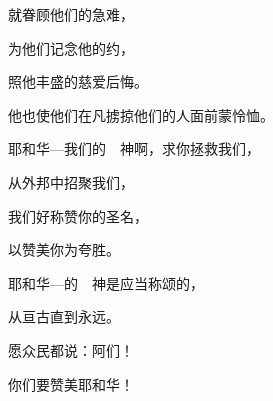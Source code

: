 {\par }{\Q 就眷顾他们的急难，
\par }{\Q {}为他们记念他的约，
\par }{\Q 照他丰盛的慈爱后悔。
\par }{\Q {}他也使他们在凡掳掠他们的人面前蒙怜恤。
\par }{\BB \par }{\Q {}耶和华—我们的　神啊，求你拯救我们，
\par }{\Q 从外邦中招聚我们，
\par }{\Q 我们好称赞你的圣名，
\par }{\Q 以赞美你为夸胜。
\par }{\BB \par }{\Q {}耶和华—{}的　神是应当称颂的，
\par }{\Q 从亘古直到永远。
\par }{\Q 愿众民都说：阿们！
\par }{\BB \par }{\Q 你们要赞美耶和华！

}
